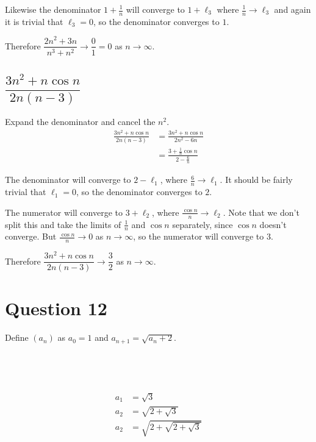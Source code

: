 \documentclass[a4paper]{article}
\renewcommand{\thesubsection}{Q\thesection~(\roman{subsection})}
\begin{document}
Likewise the denominator $1 + \frac1n$ will converge to $1 + \ell_3$ where $\frac1n \to \ell_3$ and again it is trivial that $\ell_3 = 0$, so the denominator converges to $1$.

Therefore $\dfrac{2n^2 + 3n}{n^3 + n^2} \to \dfrac01 = 0$ as $n \to \infty$.

\subsection{$\dfrac{3n^2 + n\cos n}{2n (n-3)}$}

Expand the denominator and cancel the $n^2$.
\begin{align*}
	\frac{3n^2 + n\cos n}{2n (n-3)} &= \frac{3n^2 + n\cos n}{2n^2 - 6n}\\[1ex]
									&= \frac{3 + \frac1n \cos n}{2 - \frac6n}
\end{align*}

The denominator will converge to $2 - \ell_1$, where $\frac6n \to \ell_1$. It should be fairly trivial that $\ell_1 = 0$, so the denominator converges to $2$.

The numerator will converge to $3 + \ell_2$, where $\frac{\cos n}{n} \to \ell_2$. Note that we don't split this and take the limits of $\frac1n$ and $\cos n$ separately, since $\cos n$ doesn't converge. But $\frac{\cos n}{n} \to 0$ as $n \to \infty$, so the numerator will converge to $3$.

Therefore $\dfrac{3n^2 + n\cos n}{2n (n-3)} \to \dfrac32$ as $n \to \infty$.

\renewcommand{\thesubsection}{Q\thesection~(\roman{subsection})}


\section*{Question 12}
\setcounter{section}{12}
\setcounter{subsection}{0}

Define $(a_n)$ as $a_0 = 1$ and $a_{n+1} = \sqrt{a_n + 2}$.

\subsection{~}

\begin{align*}
	a_1 &= \sqrt3\\[1ex]
	a_2 &= \sqrt{2 + \sqrt3}\\[1ex]
	a_2 &= \sqrt{2 + \sqrt{2 + \sqrt3}}
\end{align*}
\end{document}
